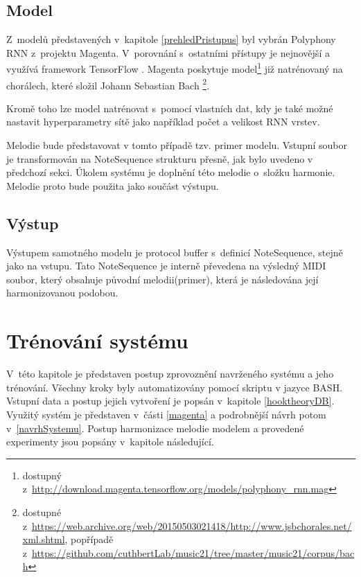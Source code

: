 \section{Model}
Z~modelů představených v~kapitole \ref{prehledPristupus} byl vybrán 
Polyphony RNN z~projektu Magenta.
V~porovnání s~ostatními přístupy je nejnovější a využívá framework TensorFlow
\cite{YinCheng_comparativeStudy,google_git_polyphony}.
Magenta poskytuje model\footnote{dostupný z~\url{http://download.magenta.tensorflow.org/models/polyphony_rnn.mag}} 
již natrénovaný na chorálech, které složil Johann Sebastian Bach
\footnote{
dostupné z~\url{https://web.archive.org/web/20150503021418/http://www.jsbchorales.net/xml.shtml}, 
popřípadě z~\url{https://github.com/cuthbertLab/music21/tree/master/music21/corpus/bach}}.

Kromě toho lze model natrénovat s~pomocí vlastních dat,
kdy je také možné nastavit hyperparametry sítě jako například počet a velikost RNN vrstev.
\cite{google_git_polyphony}
\par

Melodie bude představovat v tomto případě tzv. primer modelu. Vstupní soubor je transformován na NoteSequence strukturu přesně, jak bylo uvedeno v předchozí sekci.
Úkolem systému je doplnění této melodie o~složku harmonie. 
Melodie proto bude použita jako součást výstupu.

\section{Výstup}
Výstupem samotného modelu je protocol buffer s~definicí NoteSequence, 
stejně jako na vstupu.
Tato NoteSequence je interně převedena na výsledný MIDI soubor, 
který obsahuje původní melodii(primer), která je následována její harmonizovanou podobou.
\cite{google_git_polyphony}

\chapter{Trénování systému}
\label{trenovaniModelu}
V~této kapitole je představen postup zprovoznění navrženého systému a jeho trénování.
Všechny kroky byly automatizovány pomocí skriptu v jazyce BASH.
Vstupní data a postup jejich vytvoření je popsán v~kapitole \ref{hooktheoryDB}.
Využitý systém je představen v~části \ref{magenta} 
a podrobnější návrh potom v~\ref{navrhSystemu}.
Postup harmonizace melodie modelem a provedené experimenty jsou popsány v~kapitole následující.
\par

